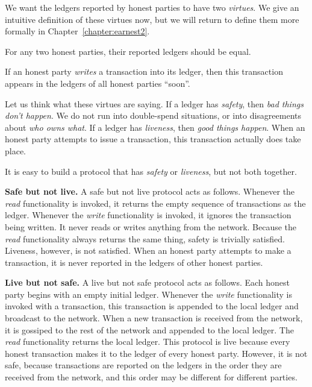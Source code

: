 We want the ledgers reported by honest parties to have two \emph{virtues}. We give
an intuitive definition of these virtues now, but we will return to define them
more formally in Chapter~\ref{chapter:earnest2}.

\begin{definition}[Safety]
    For any two honest parties, their reported ledgers should be equal.
\end{definition}

\begin{definition}[Liveness]
    If an honest party \emph{writes} a transaction into its ledger, then this
    transaction appears in the ledgers of all honest parties ``soon''.
\end{definition}

Let us think what these virtues are saying. If a ledger has \emph{safety},
then \emph{bad things don't happen}. We do not run into double-spend situations,
or into disagreements about \emph{who owns what}. If a ledger has \emph{liveness},
then \emph{good things happen}. When an honest party attempts to issue a transaction,
this transaction actually does take place.

It is easy to build a protocol that has \emph{safety} or \emph{liveness}, but not
both together.

\noindent
\textbf{Safe but not live.} A safe but not live protocol acts as follows.
Whenever the \emph{read} functionality is invoked, it returns the empty sequence of
transactions as the ledger. Whenever the \emph{write} functionality is invoked, it
ignores the transaction being written. It never reads or writes anything from the
network. Because the \emph{read} functionality always returns the same thing,
safety is trivially satisfied. Liveness, however, is not satisfied. When an honest
party attempts to make a transaction, it is never reported in the ledgers of other
honest parties.

\noindent
\textbf{Live but not safe.} A live but not safe protocol acts as follows.
Each honest party begins with an empty initial ledger. Whenever the \emph{write}
functionality is invoked with a transaction, this transaction is appended to the
local ledger and broadcast to the network. When a new transaction is received from the
network, it is gossiped to the rest of the network and appended to the local ledger.
The \emph{read} functionality returns the local ledger. This protocol is live
because every honest transaction makes it to the ledger of every honest party.
However, it is not safe, because transactions are reported on the ledgers in the
order they are received from the network, and this order may be different for
different parties.

